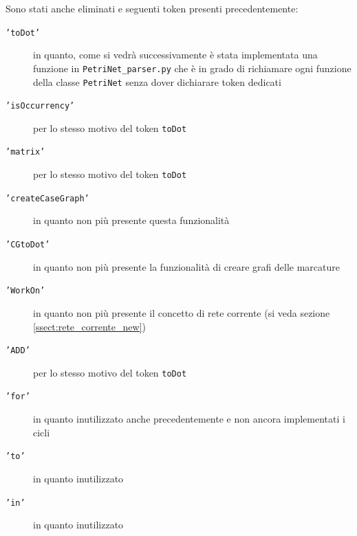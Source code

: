 \documentclass[italian,12pt]{book}
\begin{document}
Sono stati anche eliminati e seguenti token presenti precedentemente:

\begin{description}

\item[{\tt 'toDot'}] in quanto, come si vedrà successivamente è stata implementata una funzione in  {\tt PetriNet\_parser.py} che è in grado di richiamare ogni funzione della classe {\tt PetriNet} senza dover dichiarare token dedicati

\item[{\tt 'isOccurrency'}] per lo stesso motivo del token {\tt toDot}

\item[{\tt 'matrix'}] per lo stesso motivo del token {\tt toDot}

\item[{\tt 'createCaseGraph'}] in quanto non più presente questa funzionalità

\item[{\tt 'CGtoDot'}] in quanto non più presente la funzionalità di creare grafi delle marcature

\item[{\tt 'WorkOn'}] in quanto non più presente il concetto di rete corrente (si veda sezione \ref{ssect:rete_corrente_new})

\item[{\tt 'ADD'}] per lo stesso motivo del token {\tt toDot}

\item[{\tt 'for'}] in quanto inutilizzato anche precedentemente e non ancora implementati i cicli

\item[{\tt 'to'}] in quanto inutilizzato

\item[{\tt 'in'}] in quanto inutilizzato

\end{description}
\end{document}
